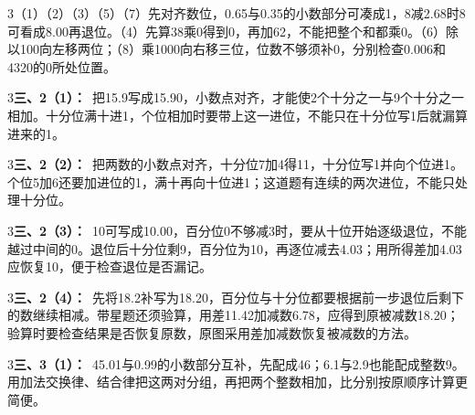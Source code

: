 \documentclass[multi=snippet,border={5bp 20bp 5bp 5bp}]{standalone}
\newenvironment{snippet}[3]{\begin{minipage}{#1bp}\color{answerred}\fontsize{#2}{#3}\selectfont\raggedright}{\end{minipage}}
\begin{document}
\begin{snippet}{505}{11.5}{14}\begin{multicols}{3}\raggedcolumns （1）（2）（3）（5）（7）先对齐数位，0.65与0.35的小数部分可凑成1，8减2.68时8可看成8.00再退位。（4）先算38乘0得到0，再加62，不能把整个和都乘0。（6）除以100向左移两位；（8）乘1000向右移三位，位数不够须补0，分别检查0.006和4320的0所处位置。\end{multicols}\end{snippet}
\begin{snippet}{505}{11.5}{14}\begin{multicols}{3}\raggedcolumns \textbf{三、2（1）：}\ 把15.9写成15.90，小数点对齐，才能使2个十分之一与9个十分之一相加。十分位满十进1，个位相加时要带上这一进位，不能只在十分位写1后就漏算进来的1。\end{multicols}\end{snippet}
\begin{snippet}{505}{11.5}{14}\begin{multicols}{3}\raggedcolumns \textbf{三、2（2）：}\ 把两数的小数点对齐，十分位7加4得11，十分位写1并向个位进1。个位5加6还要加进位的1，满十再向十位进1；这道题有连续的两次进位，不能只处理十分位。\end{multicols}\end{snippet}
\begin{snippet}{505}{11.5}{14}\begin{multicols}{3}\raggedcolumns \textbf{三、2（3）：}\ 10可写成10.00，百分位0不够减3时，要从十位开始逐级退位，不能越过中间的0。退位后十分位剩9，百分位为10，再逐位减去4.03；用所得差加4.03应恢复10，便于检查退位是否漏记。\end{multicols}\end{snippet}
\begin{snippet}{505}{11.5}{14}\begin{multicols}{3}\raggedcolumns \textbf{三、2（4）：}\ 先将18.2补写为18.20，百分位与十分位都要根据前一步退位后剩下的数继续相减。带星题还须验算，用差11.42加减数6.78，应得到原被减数18.20；验算时要检查结果是否恢复原数，原图采用差加减数恢复被减数的方法。\end{multicols}\end{snippet}
\begin{snippet}{505}{11.5}{14}\begin{multicols}{3}\raggedcolumns \textbf{三、3（1）：}\ 45.01与0.99的小数部分互补，先配成46；6.1与2.9也能配成整数9。用加法交换律、结合律把这两对分组，再把两个整数相加，比分别按原顺序计算更简便。\end{multicols}\end{snippet}
\end{document}
